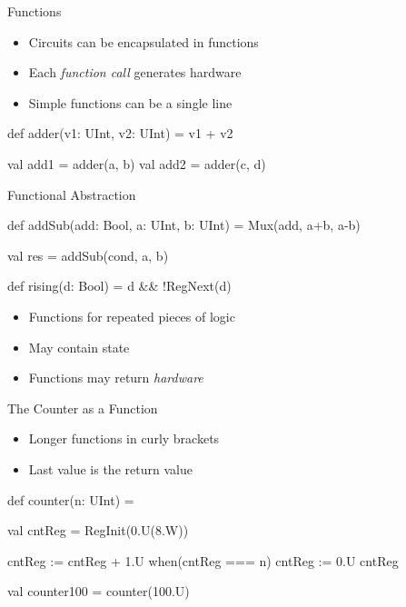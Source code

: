 
\begin{frame}[fragile]{Functions}
\begin{itemize}
\item Circuits can be encapsulated in functions
\item Each \emph{function call} generates hardware
\item Simple functions can be a single line
\end{itemize}
\begin{chisel}
  def adder(v1: UInt, v2: UInt) = v1 + v2
  
  val add1 = adder(a, b)
  val add2 = adder(c, d)
\end{chisel}
\end{frame}

\begin{frame}[fragile]{Functional Abstraction}
\begin{chisel}
  def addSub(add: Bool, a: UInt, b: UInt) =
    Mux(add, a+b, a-b)

  val res = addSub(cond, a, b)
  
  def rising(d: Bool) = d && !RegNext(d)
\end{chisel}
\begin{itemize}
\item Functions for repeated pieces of logic
\item May contain state
\item Functions may return \emph{hardware}
\end{itemize}
\end{frame}

\begin{frame}[fragile]{The Counter as a Function}
\begin{itemize}
\item Longer functions in curly brackets
\item Last value is the return value
\end{itemize}
\begin{chisel}
def counter(n: UInt) = {
  
  val cntReg = RegInit(0.U(8.W))
  
  cntReg := cntReg + 1.U
  when(cntReg === n) {
    cntReg := 0.U
  }
  cntReg
}

val counter100 = counter(100.U)
\end{chisel}
\end{frame}


